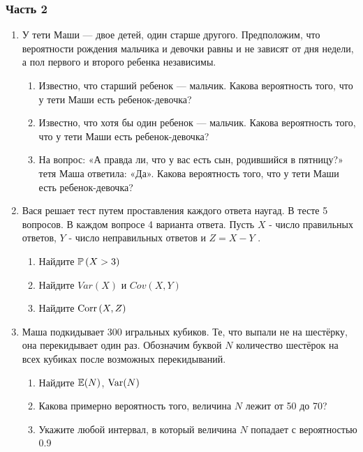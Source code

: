 \documentclass[12pt, a4paper]{article}\usepackage[]{graphicx}\usepackage[]{color}
\begin{document}
\subsubsection*{Часть 2}

\begin{enumerate}

\item У тети Маши — двое детей, один старше другого. Предположим, что вероятности рождения мальчика и девочки равны и не зависят от дня недели, а пол первого и второго ребенка независимы.
\begin{enumerate}
\item Известно, что старший ребенок — мальчик. Какова
вероятность того, что у тети Маши есть ребенок-девочка?
\item Известно, что хотя бы один ребенок — мальчик. Какова
вероятность того, что у тети Маши есть ребенок-девочка?
\item На вопрос: «А правда ли, что у вас есть сын, родившийся в пятницу?» тетя Маша ответила: «Да». Какова
вероятность того, что у тети Маши есть ребенок-девочка?
\end{enumerate}


\item Вася решает тест путем проставления каждого ответа наугад. В тесте 5 вопросов. В каждом вопросе 4 варианта ответа. Пусть  $X$  - число правильных ответов,  $Y$  - число неправильных ответов и  $Z=X-Y$ .

\begin{enumerate}
\item Найдите  $\P\left(X>3\right)$

\item Найдите  $Var\left(X\right)$  и  $Cov\left(X,Y\right)$

\item Найдите  $\Corr\left(X,Z\right)$
\end{enumerate}


\item Маша подкидывает 300 игральных кубиков. Те, что выпали не на шестёрку, она перекидывает один раз. Обозначим буквой $N$ количество шестёрок на всех кубиках после возможных перекидываний.
\begin{enumerate}
\item Найдите $\E(N)$, $\Var(N)$
\item Какова примерно вероятность того, величина $N$ лежит от 50 до 70?
\item Укажите любой интервал, в который величина $N$ попадает с вероятностью 0.9
\end{enumerate}

\end{enumerate}
\end{document}
